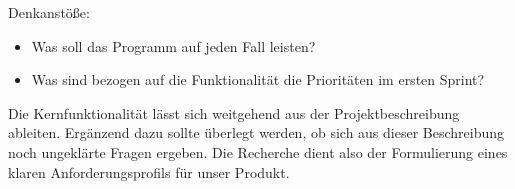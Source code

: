 Denkanstöße:
\begin{itemize}
\item Was soll das Programm auf jeden Fall leisten?
\item Was sind bezogen auf die Funktionalität die Prioritäten im ersten Sprint?
\end{itemize}
Die Kernfunktionalität lässt sich weitgehend aus der Projektbeschreibung ableiten. Ergänzend dazu sollte überlegt werden, ob sich aus dieser Beschreibung noch ungeklärte Fragen ergeben. Die Recherche dient also der Formulierung eines klaren Anforderungsprofils für unser Produkt.
\nsecend